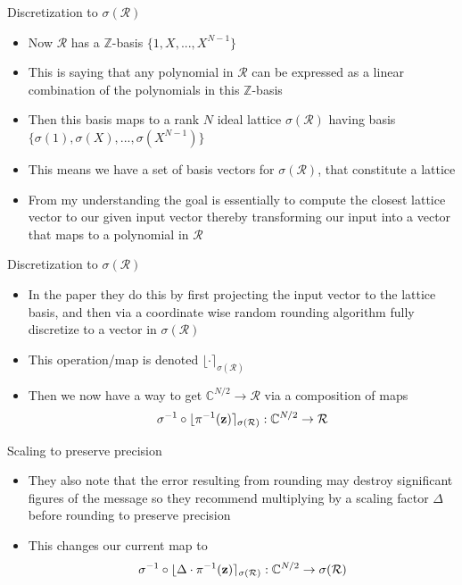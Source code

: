 \documentclass{beamer}
\begin{document}
\begin{frame}{Discretization to $\sigma(\mathcal{R})$}
	\begin{itemize}[<+->]
		\item Now $\mathcal{R}$ has a $\mathbb{Z}$-basis $\{1,X,...,X^{N-1}\}$
		\item This is saying that any polynomial in $\mathcal{R}$ can be expressed as a linear combination of the polynomials
		in this $\mathbb{Z}$-basis
		\item Then this basis maps to a rank $N$ ideal lattice $\sigma(\mathcal{R})$ having basis $\{\sigma(1),\sigma(X),...,\sigma(X^{N-1})\}$
		\item This means we have a set of basis vectors for $\sigma(\mathcal{R})$, that constitute a lattice
		\item From my understanding the goal is essentially to compute the closest lattice vector to our given input vector
		thereby transforming our input into a vector that maps to a polynomial in $\mathcal{R}$
	\end{itemize}
\end{frame}

\begin{frame}{Discretization to $\sigma(\mathcal{R})$}
	\begin{itemize}[<+->]
		\item In the paper they do this by first projecting the input vector to the lattice basis, and then via a coordinate
		wise random rounding algorithm fully discretize to a vector in $\sigma(\mathcal{R})$
		\item This operation/map is denoted $\lfloor \cdot \rceil_{\sigma(\mathcal{R})}$
		\item Then we now have a way to get $\mathbb{C}^{N/2} \to \mathcal{R}$ via a composition of maps
		\[ \sigma^{-1 } \circ \lfloor \pi^{-1}({\bf z}) \rceil_{\sigma(\mathcal{R})} : \mathbb{C}^{N/2} \to \mathcal{R}\]
	\end{itemize}
\end{frame}


\begin{frame}{Scaling to preserve precision}
	\begin{itemize}[<+->]
		\item They also note that the error resulting from rounding may destroy significant figures of the message so they recommend
		multiplying by a scaling factor $\Delta$ before rounding to preserve precision
		\item This changes our current map to
		\[ \sigma^{-1 } \circ \lfloor \Delta \cdot \pi^{-1}({\bf z}) \rceil_{\sigma(\mathcal{R})} : \mathbb{C}^{N/2} \to \sigma(\mathcal{R})\]
	\end{itemize}
\end{frame}
\end{document}
